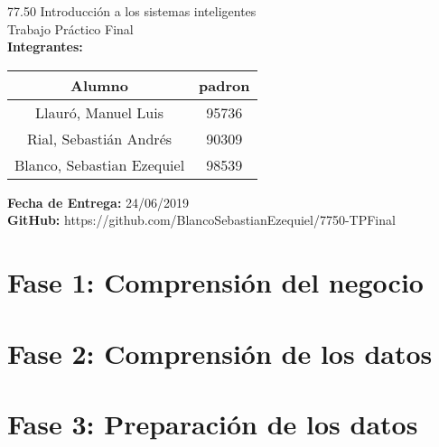 

		
	\begin{titlepage}
		\vspace*{\fill}
		\begin{center}
			\Large 77.50 Introducción a los sistemas inteligentes \\
			\Huge Trabajo Práctico Final\\
			\bigskip\bigskip\bigskip
			\large\textbf{Integrantes:} \\
			\begin{center}
				\begin{tabular}{||c | c||} 
					\hline
					Alumno & padron \\ [0.5ex] 
					\hline\hline
					Llauró, Manuel Luis & 95736 \\
					\hline
					Rial, Sebastián Andrés & 90309 \\
					\hline
					Blanco, Sebastian Ezequiel & 98539 \\
					\hline
				\end{tabular}
			\end{center}
			\textbf{Fecha de Entrega:} 24/06/2019\\
			\textbf{GitHub:} https://github.com/BlancoSebastianEzequiel/7750-TPFinal\\

		\end{center}
		\vspace*{\fill}
	\end{titlepage}
	\newpage
			
	\tableofcontents
	\newpage
	\section{Fase 1: Comprensión del negocio}
		

	\newpage
	\section{Fase 2: Comprensión de los datos}
		

	\newpage
	\section{Fase 3: Preparación de los datos}
		

